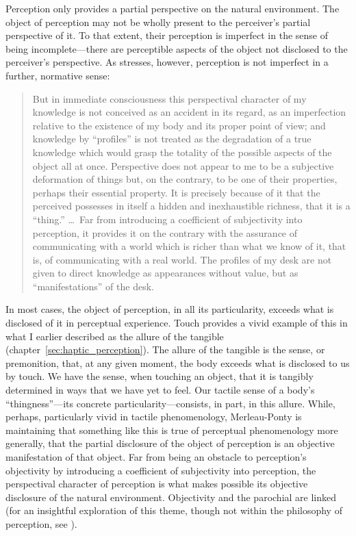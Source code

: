 Perception only provides a partial perspective on the natural environment. The object of perception may not be wholly present to the perceiver's partial perspective of it. To that extent, their perception is imperfect in the sense of being incom\-plete---there are perceptible aspects of the object not disclosed to the perceiver's perspective. As \citet[]{Merleau-Ponty:1964aa} stresses, however, perception is not imperfect in a further, normative sense:
\begin{quote}
	But in immediate consciousness this perspectival character of my knowledge is not conceived as an accident in its regard, as an imperfection relative to the existence of my body and its proper point of view; and knowledge by ``profiles'' is not treated as the degradation of a true knowledge which would grasp the totality of the possible aspects of the object all at once. Perspective does not appear to me to be a subjective deformation of things but, on the contrary, to be one of their properties, perhaps their essential property. It is precisely because of it that the perceived possesses in itself a hidden and inexhaustible richness, that it is a ``thing.'' \ldots\ Far from introducing a coefficient of subjectivity into perception, it provides it on the contrary with the assurance of communicating with a world which is richer than what we know of it, that is, of communicating with a real world. The profiles of my desk are not given to direct knowledge as appearances without value, but as ``manifestations'' of the desk. \citep[186]{Merleau-Ponty:1964ab}
\end{quote}
In most cases, the object of perception, in all its particularity, exceeds what is disclosed of it in perceptual experience. Touch provides a vivid example of this in what I earlier described as the allure of the tangible (chapter~\ref{sec:haptic_perception}). The allure of the tangible is the sense, or premonition, that, at any given moment, the body exceeds what is disclosed to us by touch. We have the sense, when touching an object, that it is tangibly determined in ways that we have yet to feel. Our tactile sense of a body's ``thingness''---its concrete particularity---consists, in part, in this allure. While, perhaps, particularly vivid in tactile phenomenology, Merleau-Ponty is maintaining that something like this is true of perceptual phenomenology more generally, that the partial disclosure of the object of perception is an objective manifestation of that object. Far from being an obstacle to perception's objectivity by introducing a coefficient of subjectivity into perception, the perspectival character of perception is what makes possible its objective disclosure of the natural environment. Objectivity and the parochial are linked (for an insightful exploration of this theme, though not within the philosophy of perception, see \citealt{Travis:2011qd}).

